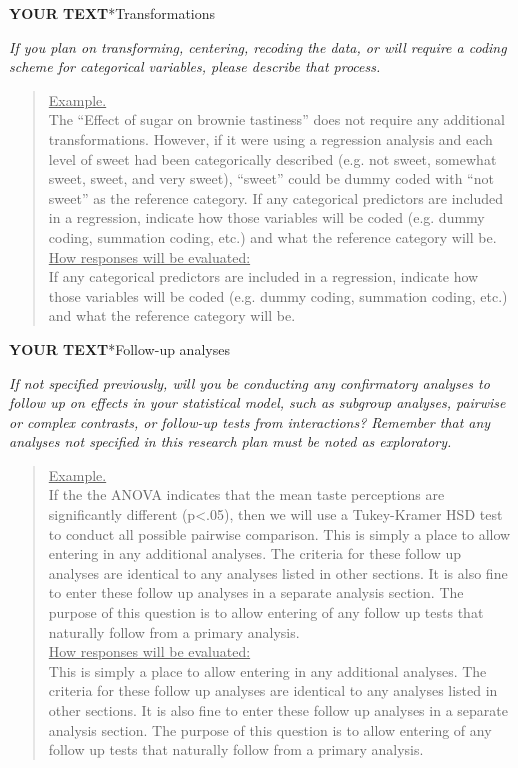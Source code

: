 \documentclass{article}
\newcommand{\example}[2]{\vspace{-0.3cm}\begin{quote}\underline{Example.}\\#1\ifx#2\undefined \else \\[0.2cm]\underline{How responses will be evaluated:}\\#2\fi\\\end{quote}}
\newcommand{\yourtext}[1]{\noindent\textbf{\color{red}YOUR TEXT}}
\begin{document}
	\fi
	
	\yourtext
	
	\subsection*{Transformations}
	
	\ifx\hidehints\undefined
	
	\textit{%
		If you plan on transforming, centering, recoding the data, or will require a coding scheme for categorical variables, please describe that process.
	}\\
	
	\example{
		The ``Effect of sugar on brownie tastiness'' does not require any additional transformations. However, if it were using a regression analysis and each level of sweet had been categorically described (e.g. not sweet, somewhat sweet, sweet, and very sweet), ``sweet'' could be dummy coded with ``not sweet'' as the reference category. 
		}{If any categorical predictors are included in a regression, indicate how those variables will be coded (e.g. dummy coding, summation coding, etc.) and what the reference category will be.
	}
	\fi
	
	\yourtext
	
	\subsection*{Follow-up analyses}
	
	\ifx\hidehints\undefined
	
	\textit{%
		If not specified previously, will you be conducting any confirmatory analyses to follow up on effects in your statistical model, such as subgroup analyses, pairwise or complex contrasts, or follow-up tests from interactions? Remember that any analyses not specified in this research plan must be noted as exploratory.
	}\\
	
	\example{
		If the the ANOVA indicates that the mean taste perceptions are significantly different (p<.05), then we will use a Tukey-Kramer HSD test to conduct all possible pairwise comparison.
		}{This is simply a place to allow entering in any additional analyses. The criteria for these follow up analyses are identical to any analyses listed in other sections. It is also fine to enter these follow up analyses in a separate analysis section. The purpose of this question is to allow entering of any follow up tests that naturally follow from a primary analysis.}
	\fi
	
\end{document}
